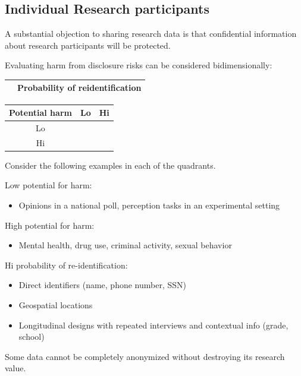 \documentclass[
  english,
]{book}
\providecommand{\tightlist}{%
  \setlength{\itemsep}{0pt}\setlength{\parskip}{0pt}}
\begin{document}
\hypertarget{individual-research-participants}{%
\subsection{Individual Research participants}\label{individual-research-participants}}

A substantial objection to sharing research data is that confidential information about research participants will be protected.

Evaluating harm from disclosure risks can be considered bidimensionally:

\begin{longtable}[]{@{}lc@{}}
\toprule
& Probability of reidentification\tabularnewline
\midrule
\endhead
\bottomrule
\end{longtable}

\begin{longtable}[]{@{}ccc@{}}
\toprule
Potential harm & Lo & Hi\tabularnewline
\midrule
\endhead
Lo & &\tabularnewline
Hi & &\tabularnewline
\bottomrule
\end{longtable}

Consider the following examples in each of the quadrants.

Low potential for harm:

\begin{itemize}
\tightlist
\item
  Opinions in a national poll, perception tasks in an experimental setting
\end{itemize}

High potential for harm:

\begin{itemize}
\tightlist
\item
  Mental health, drug use, criminal activity, sexual behavior
\end{itemize}

Hi probability of re-identification:

\begin{itemize}
\tightlist
\item
  Direct identifiers (name, phone number, SSN)
\item
  Geospatial locations
\item
  Longitudinal designs with repeated interviews and contextual info (grade, school)
\end{itemize}

Some data cannot be completely anonymized without destroying its research value.
\end{document}
